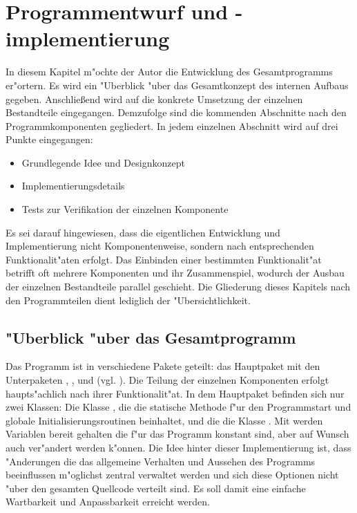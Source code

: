 \chapter{Programmentwurf und -implementierung}
\label{chap:entwurf}

In diesem Kapitel m"ochte der Autor die Entwicklung des Gesamtprogramms er"ortern.
Es wird ein "Uberblick "uber das Gesamtkonzept des internen Aufbaus gegeben.
Anschlie{\ss}end wird auf die konkrete Umsetzung der einzelnen Bestandteile eingegangen.
Demzufolge sind die kommenden Abschnitte nach den Programmkomponenten gegliedert.
In jedem einzelnen Abschnitt wird auf drei Punkte eingegangen:
\begin{itemize}
	\item Grundlegende Idee und Designkonzept
	\item Implementierungsdetails
	\item Tests zur Verifikation der einzelnen Komponente
\end{itemize}
Es sei darauf hingewiesen, dass die eigentlichen Entwicklung und Implementierung nicht Komponentenweise, sondern nach entsprechenden Funktionalit"aten erfolgt.
Das Einbinden einer bestimmten Funktionalit"at betrifft oft mehrere Komponenten und ihr Zusammenspiel, wodurch der Ausbau der einzelnen Bestandteile parallel geschieht.
Die Gliederung dieses Kapitels nach den Programmteilen dient lediglich der "Ubersichtlichkeit.

\section{"Uberblick "uber das Gesamtprogramm}

Das Programm ist in verschiedene Pakete geteilt: das Hauptpaket  mit den Unterpaketen , ,  und  (vgl. ).
Die Teilung der einzelnen Komponenten erfolgt haupts"achlich nach ihrer Funktionalit"at.
In dem Hauptpaket  befinden sich nur zwei Klassen:
Die Klasse , die die statische Methode f"ur den Programmstart und globale Initialisierungsroutinen beinhaltet, und die die Klasse .
Mit  werden Variablen bereit gehalten die f"ur das Programm konstant sind, aber auf Wunsch auch ver"andert werden k"onnen.
Die Idee hinter dieser Implementierung ist, dass "Anderungen die das allgemeine Verhalten und Aussehen des Programms beeinflussen m"oglichst zentral verwaltet werden und sich diese Optionen nicht "uber den gesamten Quellcode verteilt sind.
Es soll damit eine einfache Wartbarkeit und Anpassbarkeit erreicht werden.

